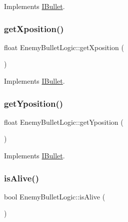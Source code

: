 Implements \hyperlink{class_i_bullet_a327968e71126cdea5998076d8919354f}{I\+Bullet}.

\mbox{\label{class_enemy_bullet_logic_afe73016d27c33171a20c15e11026106e}} 
\subsubsection{\texorpdfstring{get\+Xposition()}{getXposition()}}
{\footnotesize\ttfamily float Enemy\+Bullet\+Logic\+::get\+Xposition (\begin{DoxyParamCaption}{ }\end{DoxyParamCaption})\hspace{0.3cm}{\ttfamily [virtual]}}



Implements \hyperlink{class_i_bullet_a20babdd6c657ddda175e84a56564dcfa}{I\+Bullet}.

\mbox{\label{class_enemy_bullet_logic_a0cfb3013a7613f7f6de91a6db04d03b1}} 
\subsubsection{\texorpdfstring{get\+Yposition()}{getYposition()}}
{\footnotesize\ttfamily float Enemy\+Bullet\+Logic\+::get\+Yposition (\begin{DoxyParamCaption}{ }\end{DoxyParamCaption})\hspace{0.3cm}{\ttfamily [virtual]}}



Implements \hyperlink{class_i_bullet_a36594de9a0c0ddd7083bca10ef5d8332}{I\+Bullet}.

\mbox{\label{class_enemy_bullet_logic_a42d10bdfde42178e272997de9b387398}} 
\subsubsection{\texorpdfstring{is\+Alive()}{isAlive()}}
{\footnotesize\ttfamily bool Enemy\+Bullet\+Logic\+::is\+Alive (\begin{DoxyParamCaption}{ }\end{DoxyParamCaption})\hspace{0.3cm}{\ttfamily [virtual]}}



